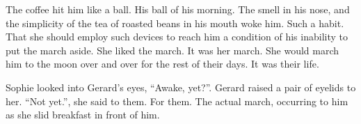 

The coffee hit him like a ball.  His ball of his morning.  The smell
in his nose, and the simplicity of the tea of roasted beans in his
mouth woke him.  Such a habit.  That she should employ such devices to
reach him a condition of his inability to put the march aside.  She
liked the march.  It was her march.  She would march him to the moon
over and over for the rest of their days.  It was their life.

Sophie looked into Gerard's eyes, ``Awake, yet?''.  Gerard raised a
pair of eyelids to her.  ``Not yet.'', she said to them.  For them.
The actual march, occurring to him as she slid breakfast in front of
him.

\bye

